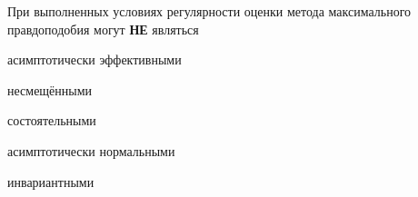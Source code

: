 
\begin{question}
При выполненных условиях регулярности оценки метода максимального
правдоподобия могут \textbf{НЕ} являться
\begin{answerlist}
  \item асимптотически эффективными
  \item несмещёнными
  \item состоятельными
  \item асимптотически нормальными
  \item инвариантными
\end{answerlist}
\end{question}


